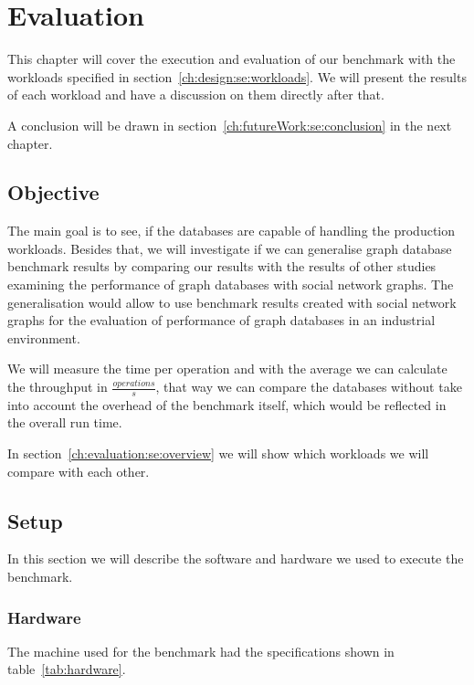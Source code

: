 \chapter{Evaluation}
\label{ch:evaluation}
This chapter will cover the execution and evaluation of our benchmark with the workloads specified in section~\ref{ch:design:se:workloads}.
We will present the results of each workload and have a discussion on them directly after that.

A conclusion will be drawn in section~\ref{ch:futureWork:se:conclusion} in the next chapter.

\section{Objective}
The main goal is to see,
if the databases are capable of handling the production workloads.
Besides that,
we will investigate if we can generalise graph database benchmark results by comparing our results with the results of other studies examining the performance of graph databases with social network graphs.
The generalisation would allow to use benchmark results created with social network graphs for the evaluation of performance of graph databases in an industrial environment.

We will measure the time per operation and with the average we can calculate the throughput in $ \frac{operations}{s} $,
that way we can compare the databases without take into account the overhead of the benchmark itself,
which would be reflected in the overall run time.

In section~\ref{ch:evaluation:se:overview} we will show which workloads we will compare with each other.

\section{Setup}
In this section we will describe the software and hardware we used to execute the benchmark.

\subsection{Hardware}
The machine used for the benchmark had the specifications shown in table~\ref{tab:hardware}.

